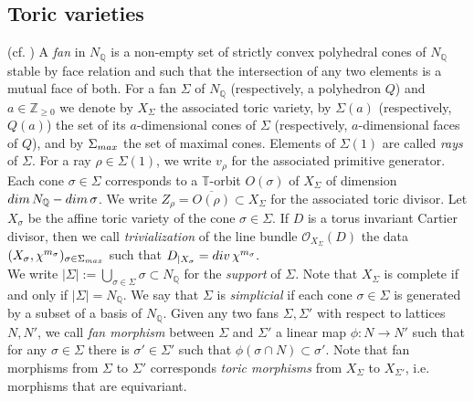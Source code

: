 \documentclass[11pt, reqno]{amsart}
\theoremstyle{plain}
\theoremstyle{definition}
\theoremstyle{remark}
\begin{document}
\subsection{Toric varieties} (cf. \cite{CLS11})\label{Section-Cox}
A \emph{fan} in $N_{\mathbb{Q}}$ is a non-empty set of strictly convex polyhedral cones of $N_{\mathbb{Q}}$ stable by face relation and such that the intersection of any two elements is a mutual face of both.  For a fan $\Sigma$ of $N_{\mathbb{Q}}$ (respectively, a polyhedron $Q$)  and $a\in \mathbb{Z}_{\geq 0}$
we denote by $X_{\Sigma}$ the associated toric variety, by $\Sigma(a)$ (respectively, $Q(a)$) the set of its $a$-dimensional cones of $\Sigma$ (respectively, $a$-dimensional faces of $Q$), and by $\Sigma_{\rm max}$ the set 
of maximal cones. Elements of  $\Sigma(1)$ are called \emph{rays} of $\Sigma$. For a ray $\rho\in \Sigma(1)$, we write $v_{\rho}$ for the associated primitive generator. 
Each cone $\sigma\in \Sigma$ corresponds to a $\mathbb{T}$-orbit $O(\sigma)$ of $X_{\Sigma}$ of  dimension ${\rm dim}\, N_{\mathbb{Q}} - {\rm dim}\, \sigma$. We write $Z_{\rho} =  \overline{O(\rho)}\subset X_{\Sigma}$ for the associated toric divisor. 
Let $X_{\sigma}$ be the affine toric variety of the cone $\sigma\in \Sigma$. 
If $D$ is a torus invariant Cartier divisor, then we call \emph{trivialization}
of the line bundle $\mathcal{O}_{X_{\Sigma}}(D)$ the data $(X_{\sigma}, \chi^{m_{\sigma}})_{\sigma\in \Sigma_{\rm max}}$ such 
that $D_{|X_{\sigma}}  =  {\rm div}\, \chi^{m_{\sigma}}.$ 
\\

We write 
$|\Sigma| :=  \bigcup_{\sigma \in \Sigma}\sigma\subset N_{\mathbb{Q}}$
for the \emph{support} of $\Sigma$. Note that $X_{\Sigma}$ is complete if and only if $|\Sigma| =  N_{\mathbb{Q}}$. We say 
that $\Sigma$ is \emph{simplicial} if each cone $\sigma\in\Sigma$ is generated by a subset of a basis of $N_{\mathbb{Q}}$. 
Given any two fans $\Sigma, \Sigma'$ with respect to lattices $N, N'$, we call \emph{fan morphism} between $\Sigma$ and $\Sigma'$
a linear map $\phi: N\rightarrow N'$ such that for any $\sigma\in \Sigma$ there is $\sigma'\in \Sigma'$ such that $\phi(\sigma\cap N)\subset  \sigma'$. Note that fan morphisms from $\Sigma$ to $\Sigma'$ corresponds \emph{toric morphisms} from $X_{\Sigma}$ to $X_{\Sigma'}$, i.e. morphisms that are equivariant. 
\\
\end{document}
